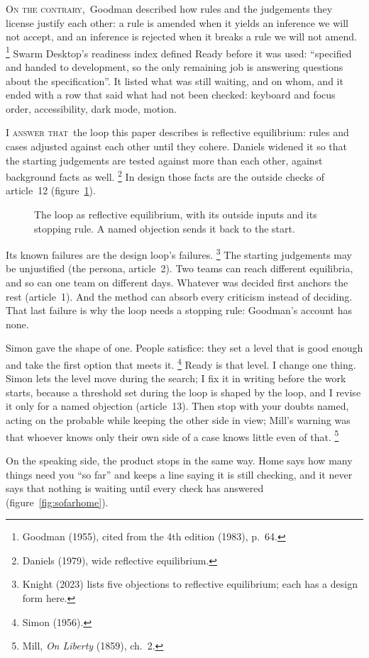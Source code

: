 \documentclass[11pt,a4paper]{article}
\newcounter{art}
\newcommand{\SedContra}{\par\vspace{1.5mm}\noindent\textsc{On the contrary,}\ }
\newcommand{\Respondeo}{\par\vspace{1.5mm}\noindent\textsc{I answer that}\ }
\newcommand{\Fig}[3]{%
  \begin{figure}[tbp]\centering #1 \caption{#2}\label{#3}\end{figure}}
\begin{document}
\SedContra Goodman described how rules and the judgements they license justify each other: a rule is amended when it yields an inference we will not accept, and an inference is rejected when it breaks a rule we will not amend.%
\footnote{Goodman (1955), cited from the 4th edition (1983), p.~64.}
Swarm Desktop's readiness index defined Ready before it was used: ``specified and handed to development, so the only remaining job is answering questions about the specification''. It listed what was still waiting, and on whom, and it ended with a row that said what had not been checked: keyboard and focus order, accessibility, dark mode, motion.

\Respondeo the loop this paper describes is reflective equilibrium: rules and cases adjusted against each other until they cohere. Daniels widened it so that the starting judgements are tested against more than each other, against background facts as well.%
\footnote{Daniels (1979), wide reflective equilibrium.}
In design those facts are the outside checks of article~12 (figure~\ref{fig:equilibrium}).

\Fig{\FigEquilibrium}{The loop as reflective equilibrium, with its outside inputs and its stopping rule. A named objection sends it back to the start.}{fig:equilibrium}

Its known failures are the design loop's failures.%
\footnote{Knight (2023) lists five objections to reflective equilibrium; each has a design form here.}
The starting judgements may be unjustified (the persona, article~2). Two teams can reach different equilibria, and so can one team on different days. Whatever was decided first anchors the rest (article~1). And the method can absorb every criticism instead of deciding. That last failure is why the loop needs a stopping rule: Goodman's account has none.

Simon gave the shape of one. People satisfice: they set a level that is good enough and take the first option that meets it.%
\footnote{Simon (1956).}
Ready is that level. I change one thing. Simon lets the level move during the search; I fix it in writing before the work starts, because a threshold set during the loop is shaped by the loop, and I revise it only for a named objection (article~13). Then stop with your doubts named, acting on the probable while keeping the other side in view; Mill's warning was that whoever knows only their own side of a case knows little even of that.%
\footnote{Mill, \textit{On Liberty} (1859), ch.~2.}

On the speaking side, the product stops in the same way. Home says how many things need you ``so far'' and keeps a line saying it is still checking, and it never says that nothing is waiting until every check has answered (figure~\ref{fig:sofarhome}).
\end{document}
